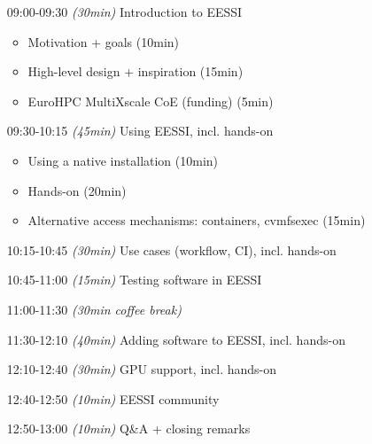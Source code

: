 \begin{itemize}[style=standard, labelwidth=1.9cm]


    \item [09:00-09:30] \emph{(30min)} Introduction to EESSI
    \begin{itemize}
        \item Motivation + goals (10min)
        \item High-level design + inspiration (15min)
        \item EuroHPC MultiXscale CoE (funding) (5min)
    \end{itemize}
    \item [09:30-10:15] \emph{(45min)} Using EESSI, incl. hands-on
    \begin{itemize}
        \item Using a native installation (10min)
        \item Hands-on (20min)
        \item Alternative access mechanisms: containers, cvmfsexec (15min)
    \end{itemize}
    \item [10:15-10:45] \emph{(30min)} Use cases (workflow, CI), incl. hands-on
    \item [10:45-11:00] \emph{(15min)} Testing software in EESSI
    \item [11:00-11:30] \emph{(30min coffee break)}
    \item [11:30-12:10] \emph{(40min)} Adding software to EESSI, incl. hands-on
    \item [12:10-12:40] \emph{(30min)} GPU support, incl. hands-on
    \item [12:40-12:50] \emph{(10min)} EESSI community
    \item [12:50-13:00] \emph{(10min)} Q\&A + closing remarks

\end{itemize}

